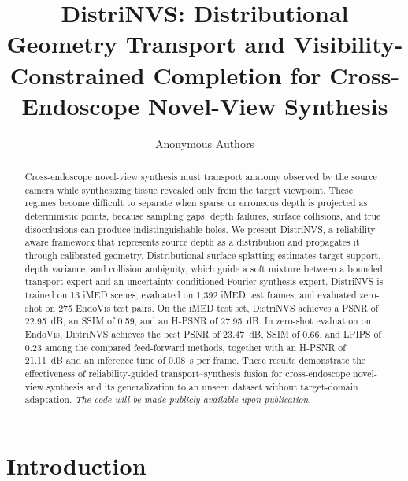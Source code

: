 \documentclass[letterpaper,10pt,conference]{ieeeconf}
\title{\LARGE \bf
DistriNVS: Distributional Geometry Transport and Visibility-Constrained Completion for Cross-Endoscope Novel-View Synthesis}
\author{Anonymous Authors}
\begin{document}
\maketitle
\thispagestyle{empty}
\pagestyle{empty}

\begin{abstract}

Cross-endoscope novel-view synthesis must transport anatomy observed by the
source camera while synthesizing tissue revealed only from the target
viewpoint. These regimes become difficult to separate when sparse or erroneous
depth is projected as deterministic points, because sampling gaps, depth
failures, surface collisions, and true disocclusions can produce
indistinguishable holes. We present DistriNVS, a reliability-aware framework
that represents source depth as a distribution and propagates it through
calibrated geometry. Distributional surface splatting estimates target support,
depth variance, and collision ambiguity, which guide a soft mixture between a
bounded transport expert and an uncertainty-conditioned Fourier synthesis
expert.
DistriNVS is trained on 13 iMED scenes, evaluated on 1,392 iMED test frames,
and evaluated zero-shot on 275 EndoVis test pairs. On the iMED test set,
DistriNVS achieves a PSNR of 22.95~dB, an SSIM of 0.59, and an H-PSNR of
27.95~dB. In zero-shot evaluation on EndoVis, DistriNVS achieves the best
PSNR of 23.47~dB, SSIM of 0.66, and LPIPS of 0.23 among the compared
feed-forward methods, together with an H-PSNR of 21.11~dB and an inference
time of 0.08~s per frame. These results demonstrate the effectiveness of
reliability-guided transport--synthesis fusion for cross-endoscope novel-view
synthesis and its generalization to an unseen dataset without target-domain
adaptation.
\textit{\textcolor{cosamLinkBlue}{The code will be made publicly available upon publication.}}

\end{abstract}

\section{Introduction}
\label{sec:introduction}
\end{document}
